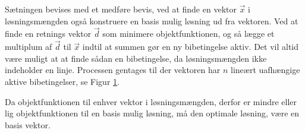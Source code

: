 Sætningen bevises med et medføre bevis, ved at finde en vektor $\vec{x}$ i løsningsmængden også konstruere en basis mulig løsning ud fra vektoren. 
Ved at finde en retnings vektor $\vec{d}$ som minimere objektfunktionen, og så lægge et multiplum af $\vec{d}$ til $\vec{x}$ indtil at summen gør en ny bibetingelse aktiv. 
Det vil altid være muligt at at finde sådan en bibetingelse, da løsningsmængden ikke indeholder en linje.
Processen gentages til der vektoren har $n$ lineært uafhængige aktive bibetingelser, se Figur \ref{fig:eksistens}.
\begin{figure}
\begin{center}
	
	\label{fig:eksistens}
\end{center}
\end{figure}
Da objektfunktionen til enhver vektor i løsningsmængden, derfor er mindre eller lig objektfunktionen til en basis mulig løsning, må den optimale løsning, være en basis vektor.
